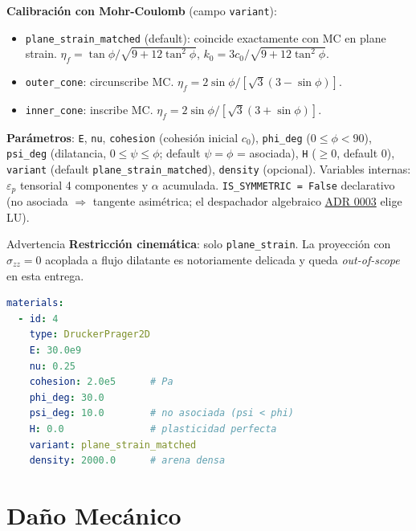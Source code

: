 \documentclass[11pt,oneside]{report}
\begin{document}
\textbf{Calibración con Mohr-Coulomb} (campo \texttt{variant}):

\begin{itemize}
  \item \texttt{plane\_\allowbreak{}strain\_\allowbreak{}matched} (default): coincide exactamente con MC en plane strain. $\eta_f = \tan\phi / \sqrt{9 + 12\tan^2\phi}$, $k_0 = 3c_0 / \sqrt{9 + 12\tan^2\phi}$.
  \item \texttt{outer\_cone}: circunscribe MC. $\eta_f = 2\sin\phi / [\sqrt 3 (3 - \sin\phi)]$.
  \item \texttt{inner\_cone}: inscribe MC. $\eta_f = 2\sin\phi / [\sqrt 3 (3 + \sin\phi)]$.
\end{itemize}

\textbf{Parámetros}: \texttt{E}, \texttt{nu}, \texttt{cohesion} (cohesión inicial $c_0$), \texttt{phi\_deg} ($0 \le \phi < 90$), \texttt{psi\_deg} (dilatancia, $0 \le \psi \le \phi$; default $\psi = \phi$ = asociada), \texttt{H} ($\ge 0$, default 0), \texttt{variant} (default \texttt{plane\_\allowbreak{}strain\_\allowbreak{}matched}), \texttt{density} (opcional). Variables internas: $\varepsilon_p$ tensorial 4 componentes y $\alpha$ acumulada. \texttt{IS\_\allowbreak{}SYMMETRIC = False} declarativo (no asociada $\Rightarrow$ tangente asimétrica; el despachador algebraico \href{https://github.com/jretamav/solidum-fem/blob/main/docs/adr/0003-despachador-de-solver-algebraico.md}{ADR 0003} elige LU).

\begin{warnbox}{Advertencia}
\textbf{Restricción cinemática}: solo \texttt{plane\_strain}. La proyección con $\sigma_{zz} = 0$ acoplada a flujo dilatante es notoriamente delicada y queda \textit{out-of-scope} en esta entrega.
\end{warnbox}

\begin{lstlisting}[language=yaml]
materials:
  - id: 4
    type: DruckerPrager2D
    E: 30.0e9
    nu: 0.25
    cohesion: 2.0e5      # Pa
    phi_deg: 30.0
    psi_deg: 10.0        # no asociada (psi < phi)
    H: 0.0               # plasticidad perfecta
    variant: plane_strain_matched
    density: 2000.0      # arena densa

\end{lstlisting}

\section{Daño Mecánico}
\end{document}
